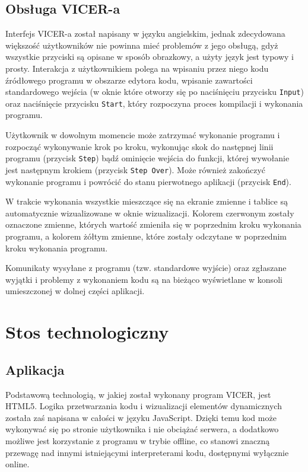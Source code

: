 \documentclass[a4paper,twoside,openright,11pt]{report}
\begin{document}
  \section{Obsługa VICER-a}
\par Interfejs VICER-a został napisany w języku angielskim, jednak zdecydowana większość użytkowników nie powinna mieć problemów z jego obsługą, gdyż wszystkie przyciski są opisane w sposób obrazkowy, a użyty język jest typowy i prosty. Interakcja z użytkownikiem polega na wpisaniu przez niego kodu źródłowego programu w obszarze edytora kodu, wpisanie zawartości standardowego wejścia (w oknie które otworzy się po naciśnięciu przycisku \texttt{Input}) oraz naciśnięcie przycisku \texttt{Start}, który rozpoczyna proces kompilacji i wykonania programu. 
\par Użytkownik w dowolnym momencie może zatrzymać wykonanie programu i rozpocząć wykonywanie krok po kroku, wykonując skok do następnej linii programu (przycisk \texttt{Step}) bądź ominięcie wejścia do funkcji, której wywołanie jest następnym krokiem (przycisk \texttt{Step Over}). Może również zakończyć wykonanie programu i powrócić do stanu pierwotnego aplikacji (przycisk \texttt{End}).
\par W trakcie wykonania wszystkie mieszczące się na ekranie zmienne i tablice są automatycznie wizualizowane w oknie wizualizacji. Kolorem czerwonym zostały oznaczone zmienne, których wartość zmieniła się w poprzednim kroku wykonania programu, a kolorem żółtym zmienne, które zostały odczytane w poprzednim kroku wykonania programu. 
\par Komunikaty wysyłane z programu (tzw. standardowe wyjście) oraz zgłaszane wyjątki i problemy z wykonaniem kodu są na bieżąco wyświetlane w konsoli umieszczonej w dolnej części aplikacji. 

  \chapter{Stos technologiczny}

  \section{Aplikacja}
\par Podstawową technologią, w jakiej został wykonany program VICER, jest HTML5. Logika przetwarzania kodu i wizualizacji elementów dynamicznych została zaś napisana w całości w języku JavaScript. Dzięki temu kod może wykonywać się po stronie użytkownika i nie obciążać serwera, a dodatkowo możliwe jest korzystanie z programu w trybie offline, co stanowi znaczną przewagę nad innymi istniejącymi interpreterami kodu, dostępnymi wyłącznie online.
\end{document}
